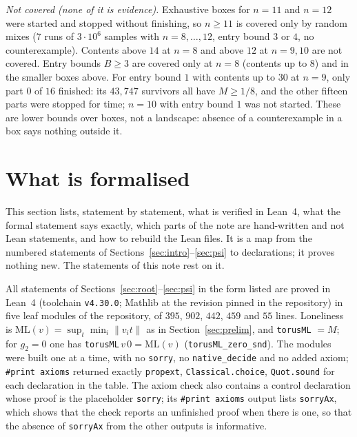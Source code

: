 \documentclass[11pt]{amsart}
\theoremstyle{definition}
\theoremstyle{remark}
\newcommand{\dist}[1]{\lVert #1\rVert}
\newcommand{\ML}{\mathrm{ML}}
\newcommand{\lean}[1]{\texttt{#1}}
\begin{document}
\emph{Not covered (none of it is evidence).} Exhaustive boxes for $n=11$ and $n=12$ were started and stopped without finishing, so $n\ge11$ is covered only by random mixes ($7$ runs of $3\cdot10^6$ samples with $n=8,\dots,12$, entry bound $3$ or $4$, no counterexample). Contents above $14$ at $n=8$ and above $12$ at $n=9,10$ are not covered. Entry bounds $B\ge3$ are covered only at $n=8$ (contents up to $8$) and in the smaller boxes above. For entry bound $1$ with contents up to $30$ at $n=9$, only part $0$ of $16$ finished: its $43{,}747$ survivors all have $M\ge1/8$, and the other fifteen parts were stopped for time; $n=10$ with entry bound $1$ was not started. These are lower bounds over boxes, not a landscape: absence of a counterexample in a box says nothing outside it.

\section{What is formalised}\label{sec:lean}

This section lists, statement by statement, what is verified in Lean~4, what the formal statement says exactly, which parts of the note are hand-written and not Lean statements, and how to rebuild the Lean files. It is a map from the numbered statements of Sections~\ref{sec:intro}--\ref{sec:psi} to declarations; it proves nothing new. The statements of this note rest on it.

All statements of Sections~\ref{sec:root}--\ref{sec:psi} in the form listed are proved in Lean~4 (toolchain \texttt{v4.30.0}; Mathlib at the revision pinned in the repository) in five leaf modules of the repository, of $395$, $902$, $442$, $459$ and $55$ lines. Loneliness is $\ML(v)=\sup_t\min_i\dist{v_it}$ as in Section~\ref{sec:prelim}, and \lean{torusML} $=M$; for $g_2=0$ one has \lean{torusML}$\,v\,0=\ML(v)$ (\lean{torusML\_zero\_snd}). The modules were built one at a time, with no \texttt{sorry}, no \texttt{native\_decide} and no added axiom; \texttt{\#print axioms} returned exactly \texttt{propext}, \texttt{Classical.choice}, \texttt{Quot.sound} for each declaration in the table. The axiom check also contains a control declaration whose proof is the placeholder \texttt{sorry}; its \texttt{\#print axioms} output lists \texttt{sorryAx}, which shows that the check reports an unfinished proof when there is one, so that the absence of \texttt{sorryAx} from the other outputs is informative.
\end{document}
